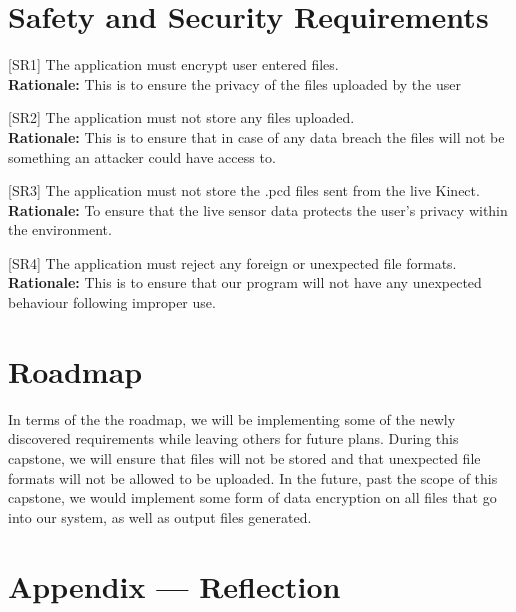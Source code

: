 \documentclass{article}
\begin{document}
\section{Safety and Security Requirements}

[SR1] The application must encrypt user entered files.\\
\textbf{Rationale:} This is to ensure the privacy of the files uploaded by the user

[SR2] The application must not store any files uploaded.\\
\textbf{Rationale:} This is to ensure that in case of any data breach the files will not be something an attacker could have access to.

[SR3] The application must not store the .pcd files sent from the live Kinect.\\
\textbf{Rationale:} To ensure that the live sensor data protects the user's privacy within the environment.

[SR4] The application must reject any foreign or unexpected file formats.\\
\textbf{Rationale:} This is to ensure that our program will not have any unexpected behaviour following improper use.

\section{Roadmap}


In terms of the the roadmap, we will be implementing some of the newly discovered requirements while leaving others for future plans. During this capstone,
we will ensure that files will not be stored and that unexpected file formats will not be allowed to be uploaded. In the future, past the scope of this capstone,
we would implement some form of data encryption on all files that go into our system, as well as output files generated.



\newpage{}

\section*{Appendix --- Reflection}



\end{document}
